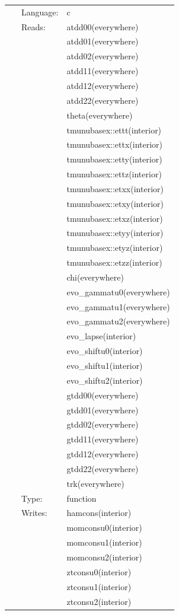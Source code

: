  \begin{tabular*}{160mm}{cll} 
~ & Language:  & c \\ 
~ & Reads:  & atdd00(everywhere) \\ 
~& ~ &atdd01(everywhere)\\ 
~& ~ &atdd02(everywhere)\\ 
~& ~ &atdd11(everywhere)\\ 
~& ~ &atdd12(everywhere)\\ 
~& ~ &atdd22(everywhere)\\ 
~& ~ &theta(everywhere)\\ 
~& ~ &tmunubasex::ettt(interior)\\ 
~& ~ &tmunubasex::ettx(interior)\\ 
~& ~ &tmunubasex::etty(interior)\\ 
~& ~ &tmunubasex::ettz(interior)\\ 
~& ~ &tmunubasex::etxx(interior)\\ 
~& ~ &tmunubasex::etxy(interior)\\ 
~& ~ &tmunubasex::etxz(interior)\\ 
~& ~ &tmunubasex::etyy(interior)\\ 
~& ~ &tmunubasex::etyz(interior)\\ 
~& ~ &tmunubasex::etzz(interior)\\ 
~& ~ &chi(everywhere)\\ 
~& ~ &evo\_gammatu0(everywhere)\\ 
~& ~ &evo\_gammatu1(everywhere)\\ 
~& ~ &evo\_gammatu2(everywhere)\\ 
~& ~ &evo\_lapse(interior)\\ 
~& ~ &evo\_shiftu0(interior)\\ 
~& ~ &evo\_shiftu1(interior)\\ 
~& ~ &evo\_shiftu2(interior)\\ 
~& ~ &gtdd00(everywhere)\\ 
~& ~ &gtdd01(everywhere)\\ 
~& ~ &gtdd02(everywhere)\\ 
~& ~ &gtdd11(everywhere)\\ 
~& ~ &gtdd12(everywhere)\\ 
~& ~ &gtdd22(everywhere)\\ 
~& ~ &trk(everywhere)\\ 
~ & Type:  & function \\ 
~ & Writes:  & hamcons(interior) \\ 
~& ~ &momconsu0(interior)\\ 
~& ~ &momconsu1(interior)\\ 
~& ~ &momconsu2(interior)\\ 
~& ~ &ztconsu0(interior)\\ 
~& ~ &ztconsu1(interior)\\ 
~& ~ &ztconsu2(interior)\\ 
\end{tabular*} 


